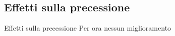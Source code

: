 \subsection[Effetti]{Effetti sulla precessione}
    \begin{frame}{Effetti sulla precessione}
        Per ora nessun miglioramento
    \end{frame}